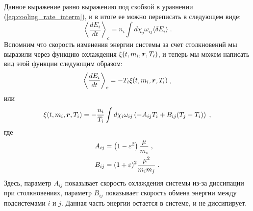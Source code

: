 Данное выражение равно выражению под скобкой в уравнении (\ref{eq:cooling_rate_interm}), и в итоге ее можно переписать в
следующем виде:
\begin{equation}
  \left\langle\frac{dE_i}{dt}\right\rangle_c = n_i\int d\chi_j\omega_{ij}\langle\delta E_i\rangle\;.
\end{equation} 
Вспомним что скорость изменения энергии системы за счет столкновений мы выразили через функцию охлаждения $\xi(t,m_i,\bm{r},T_i)$, 
и теперь мы можем написать вид этой функции следующим образом:
\begin{equation}
  \left\langle\frac{dE_i}{dt}\right\rangle_c = -T_i\xi(t,m_i,\bm{r},T_i)\;,
\end{equation} 
или
\begin{equation}
  \xi(t,m_i,\bm{r},T_i)=-\frac{n_i}{T_i}\int d\chi_i\omega_{ij}\left(-A_{ij}T_i+B_{ij}(T_j-T_i)\right)\;,
\end{equation}
где
\begin{equation}
  \begin{split}
    A_{ij} &= \left(1-\varepsilon^2\right)\frac{\mu}{m_i}\;,\\
    B_{ij} &= (1+\varepsilon)^2\frac{\mu^2}{m_im_j}\;.
  \end{split}
\end{equation}
Здесь, параметр $A_{ij}$ показывает скорость охлаждения системы из-за диссипации при столкновениях, 
параметр $B_{ij}$ показывает скорость обмена энергии между подсистемами $i$ и $j$. Данная часть энергии
остается в системе, и не диссипирует.
